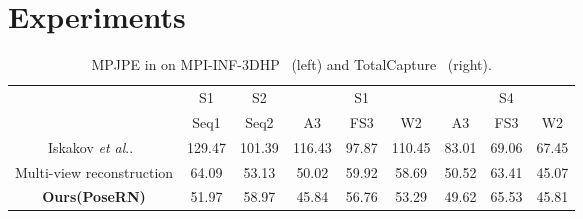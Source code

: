 \documentclass{article}
\makeatletter
\DeclareRobustCommand\onedot{\futurelet\@let@token\@onedot}
\def\@onedot{\ifx\@let@token.\else.\null\fi\xspace}
\def\etal{\emph{et al}\onedot}
\makeatother
\begin{document}
\section{Experiments}
\vspace{-0.2cm}
\begin{table*}[t]
    \centering
    \caption{MPJPE in  on MPI-INF-3DHP~\cite{mono-3dhp2017} (left) and TotalCapture~\cite{Trumble:BMVC:2017} (right).}
    \vspace{-0.3cm}
    \begin{tabular}{ccccccccc}
        \toprule
        & S1 & S2 & \multicolumn{3}{c}{S1} & \multicolumn{3}{c}{S4} \\
        \cmidrule(lr){2-2}\cmidrule(lr){3-3}\cmidrule(lr){4-6}\cmidrule(lr){7-9}
        & Seq1 & Seq2 & A3 & FS3 & W2 & A3 & FS3 & W2 \\
        \midrule
        Iskakov \etal~\cite{iskakov2019learnable} & 129.47 & 101.39 & 116.43 & 97.87 & 110.45 & 83.01 & 69.06 & 67.45\\
        Multi-view reconstruction & 64.09 & 53.13 & 50.02 & 59.92 & 58.69 & 50.52 & 63.41 & 45.07\\
        \textbf{Ours(PoseRN)} & 51.97 & 58.97 & 45.84 & 56.76 & 53.29 & 49.62 & 65.53 & 45.81\\
        \bottomrule
    \end{tabular}
    \label{tab:mpi-inf-3dhp}
\vspace{-.2cm}
\end{table*}
\end{document}
